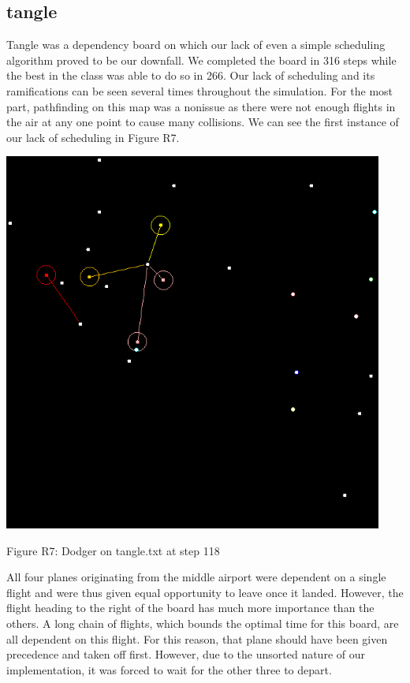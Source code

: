 \documentclass[10pt]{article}
\begin{document}
\subsection{tangle}

Tangle was a dependency board on which our lack of even a simple scheduling algorithm proved to be our downfall. We completed the board in 316 steps while the best in the class was able to do so in 266. Our lack of scheduling and its ramifications can be seen several times throughout the simulation. For the most part, pathfinding on this map was a nonissue as there were not enough flights in the air at any one point to cause many collisions. We can see the first instance of our lack of scheduling in Figure R7.

\includegraphics[width=125mm]{pics/R7.png}
\caption{Figure R7: Dodger on tangle.txt at step 118}

All four planes originating from the middle airport were dependent on a single flight and were thus given equal opportunity to leave once it landed. However, the flight heading to the right of the board has much more importance than the others. A long chain of flights, which bounds the optimal time for this board, are all dependent on this flight. For this reason, that plane should have been given precedence and taken off first. However, due to the unsorted nature of our implementation, it was forced to wait for the other three to depart.
\end{document}
